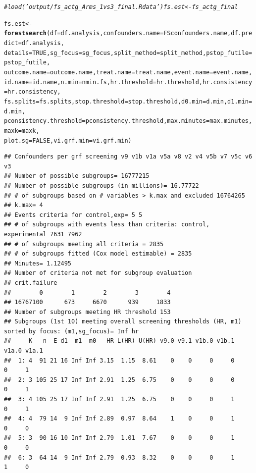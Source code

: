 \documentclass[9pt]{article}\usepackage[]{graphicx}\usepackage[]{xcolor}
\makeatletter
\newcommand{\hlnum}[1]{\textcolor[rgb]{0.686,0.059,0.569}{#1}}%
\newcommand{\hlcom}[1]{\textcolor[rgb]{0.678,0.584,0.686}{\textit{#1}}}%
\newcommand{\hlstd}[1]{\textcolor[rgb]{0.345,0.345,0.345}{#1}}%
\newcommand{\hlkwb}[1]{\textcolor[rgb]{0.69,0.353,0.396}{#1}}%
\newcommand{\hlkwc}[1]{\textcolor[rgb]{0.333,0.667,0.333}{#1}}%
\newcommand{\hlkwd}[1]{\textcolor[rgb]{0.737,0.353,0.396}{\textbf{#1}}}%
\newenvironment{kframe}{%
 \def\at@end@of@kframe{}%
 \ifinner\ifhmode%
  \def\at@end@of@kframe{\end{minipage}}%
  \begin{minipage}{\columnwidth}%
 \fi\fi%
 \def\FrameCommand##1{\hskip\@totalleftmargin \hskip-\fboxsep
 \colorbox{shadecolor}{##1}\hskip-\fboxsep
     \hskip-\linewidth \hskip-\@totalleftmargin \hskip\columnwidth}%
 \MakeFramed {\advance\hsize-\width
   \@totalleftmargin\z@ \linewidth\hsize
   \@setminipage}}%
 {\par\unskip\endMakeFramed%
 \at@end@of@kframe}
\newenvironment{knitrout}{}{} %
\theoremstyle{definition}
\theoremstyle{remark}
\makeatother
\begin{document}
\begin{knitrout}
\begin{kframe}
\begin{alltt}
\hlcom{# load('output/fs_actg_Arms_1vs3_final.Rdata') fs.est<-fs_actg_final}

\hlstd{fs.est} \hlkwb{<-} \hlkwd{forestsearch}\hlstd{(}\hlkwc{df} \hlstd{= df.analysis,} \hlkwc{confounders.name} \hlstd{= FSconfounders.name,} \hlkwc{df.predict} \hlstd{= df.analysis,}
    \hlkwc{details} \hlstd{=} \hlnum{TRUE}\hlstd{,} \hlkwc{sg_focus} \hlstd{= sg_focus,} \hlkwc{split_method} \hlstd{= split_method,} \hlkwc{pstop_futile} \hlstd{= pstop_futile,}
    \hlkwc{outcome.name} \hlstd{= outcome.name,} \hlkwc{treat.name} \hlstd{= treat.name,} \hlkwc{event.name} \hlstd{= event.name,}
    \hlkwc{id.name} \hlstd{= id.name,} \hlkwc{n.min} \hlstd{= nmin.fs,} \hlkwc{hr.threshold} \hlstd{= hr.threshold,} \hlkwc{hr.consistency} \hlstd{= hr.consistency,}
    \hlkwc{fs.splits} \hlstd{= fs.splits,} \hlkwc{stop.threshold} \hlstd{= stop.threshold,} \hlkwc{d0.min} \hlstd{= d.min,} \hlkwc{d1.min} \hlstd{= d.min,}
    \hlkwc{pconsistency.threshold} \hlstd{= pconsistency.threshold,} \hlkwc{max.minutes} \hlstd{= max.minutes,} \hlkwc{maxk} \hlstd{= maxk,}
    \hlkwc{plot.sg} \hlstd{=} \hlnum{FALSE}\hlstd{,} \hlkwc{vi.grf.min} \hlstd{= vi.grf.min)}
\end{alltt}
\begin{verbatim}
## Confounders per grf screening v9 v1b v1a v5a v8 v2 v4 v5b v7 v5c v6 v3 
## Number of possible subgroups= 16777215 
## Number of possible subgroups (in millions)= 16.77722 
## # of subgroups based on # variables > k.max and excluded 16764265 
## k.max= 4 
## Events criteria for control,exp= 5 5 
## # of subgroups with events less than criteria: control, experimental 7631 7962 
## # of subgroups meeting all criteria = 2835 
## # of subgroups fitted (Cox model estimable) = 2835 
## Minutes= 1.12495 
## Number of criteria not met for subgroup evaluation 
## crit.failure
##        0        1        2        3        4 
## 16767100      673     6670      939     1833 
## Number of subgroups meeting HR threshold 153 
## Subgroups (1st 10) meeting overall screening thresholds (HR, m1) sorted by focus: (m1,sg_focus)= Inf hr 
##     K   n  E d1  m1  m0   HR L(HR) U(HR) v9.0 v9.1 v1b.0 v1b.1 v1a.0 v1a.1
##  1: 4  91 21 16 Inf Inf 3.15  1.15  8.61    0    0     0     0     0     1
##  2: 3 105 25 17 Inf Inf 2.91  1.25  6.75    0    0     0     0     0     1
##  3: 4 105 25 17 Inf Inf 2.91  1.25  6.75    0    0     0     1     0     1
##  4: 4  79 14  9 Inf Inf 2.89  0.97  8.64    1    0     0     1     0     0
##  5: 3  90 16 10 Inf Inf 2.79  1.01  7.67    0    0     0     1     0     0
##  6: 3  64 14  9 Inf Inf 2.79  0.93  8.32    0    0     0     1     1     0

\end{verbatim}
\end{kframe}
\end{knitrout}
\end{document}
